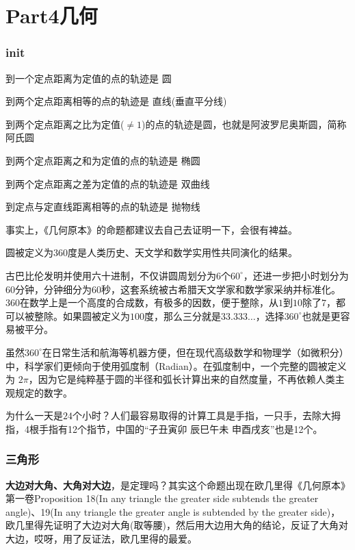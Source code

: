 \documentclass[../main.tex]{subfiles}
\begin{document}
\part{Part4几何}

\section{init}
到一个定点距离为定值的点的轨迹是 圆

到两个定点距离相等的点的轨迹是 直线(垂直平分线)

到两个定点距离之比为定值($\ne 1$)的点的轨迹是圆，也就是阿波罗尼奥斯圆，简称阿氏圆

到两个定点距离之和为定值的点的轨迹是 椭圆

到两个定点距离之差为定值的点的轨迹是 双曲线

到定点与定直线距离相等的点的轨迹是 抛物线

事实上，《几何原本》的命题都建议去自己去证明一下，会很有裨益。

圆被定义为360度是人类历史、天文学和数学实用性共同演化的结果。

古巴比伦发明并使用六十进制，不仅讲圆周划分为$6$个$60^{\circ}$，还进一步把小时划分为$60$分钟，分钟细分为$60$秒，这套系统被古希腊天文学家和数学家采纳并标准化。$360$在数学上是一个高度的合成数，有极多的因数，便于整除，从$1$到$10$除了$7$，都可以被整除。如果圆被定义为$100$度，那么三分就是$33.333\ldots$，选择$360^{\circ}$也就是更容易被平分。

虽然$360^{\circ}$在日常生活和航海等机器方便，但在现代高级数学和物理学（如微积分）中，科学家们更倾向于使用弧度制（Radian）。在弧度制中，一个完整的圆被定义为 $2\pi$，因为它是纯粹基于圆的半径和弧长计算出来的自然度量，不再依赖人类主观规定的数字。

为什么一天是$24$个小时？人们最容易取得的计算工具是手指，一只手，去除大拇指，4根手指有12个指节，中国的“子丑寅卯 辰巳午未 申酉戌亥”也是12个。



\clearpage
\section{三角形}

\textbf{大边对大角、大角对大边}，是定理吗？其实这个命题出现在欧几里得《几何原本》第一卷Proposition 18(In any triangle the greater side subtends the greater angle)、19(In any triangle the greater angle is subtended by the greater  side)，
欧几里得先证明了大边对大角(取等腰)，然后用大边用大角的结论，反证了大角对大边，哎呀，用了反证法，欧几里得的最爱。
\end{document}
